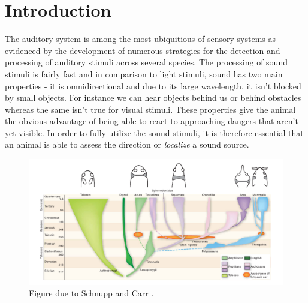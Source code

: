 \chapter{Introduction}\label{introchapter}
The auditory system is among the most ubiquitious of sensory systems as evidenced by the 
development of numerous strategies for the detection and processing of auditory stimuli
across several species. The processing of sound stimuli is fairly fast and in comparison
to light stimuli, sound has two main properties - it is omnidirectional and due to
its large wavelength, it isn't blocked by small objects. For instance we can hear objects
behind us or behind obstacles whereas the same isn't true for visual stimuli. These properties 
give the animal the obvious advantage of being able to react to approaching dangers that
aren't yet visible. In order to fully utilize the sound stimuli, it is therefore essential
that an animal is able to assess the direction or \textit{localize} a sound source.


\begin{figure}
 \includegraphics[width=1.0\linewidth]{Diagrams/vertebrateearevolution.png}
 \caption[Vertebrate Ear Evolution]{Figure due to Schnupp and Carr \cite{schnuppcarr}.}
 \label{vertebrateearevolution}
\end{figure}